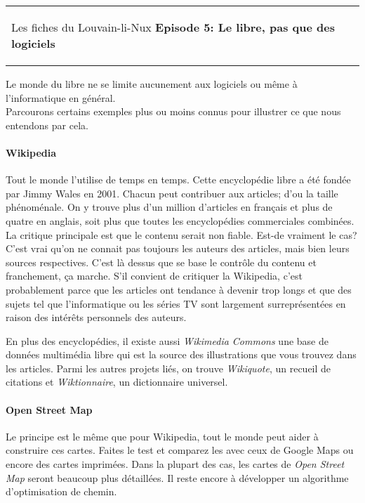 



\begin{tabular}{p{14cm}r}
    \begin{center}{\Large Les fiches du Louvain-li-Nux\linebreak \linebreak
    \LARGE \textbf{Episode 5: Le libre, pas que des logiciels}}\end{center}
		&
	\usebox{\logollnux}
\end{tabular}

Le monde du libre ne se limite aucunement aux logiciels ou même à l'informatique en général.\\
Parcourons certains exemples plus ou moins connus pour illustrer ce que nous entendons par cela.

\paragraph{Wikipedia}
Tout le monde l'utilise de temps en temps. Cette encyclopédie libre a été fondée par Jimmy Wales en 2001.
Chacun peut contribuer aux articles; d'ou la taille phénoménale.
On y trouve plus d'un million d'articles en français et plus de quatre en anglais, soit plus que toutes les encyclopédies commerciales combinées.
La critique principale est que le contenu serait non fiable.
Est-de vraiment le cas? C'est vrai qu'on ne connait pas toujours les auteurs des articles, mais bien leurs sources respectives.
C'est là dessus que se base le contrôle du contenu et franchement, ça marche.
S'il convient de critiquer la Wikipedia, c'est probablement parce que les articles ont tendance à devenir trop longs et que des sujets tel que l'informatique ou les séries TV
sont largement surreprésentées en raison des intérêts personnels des auteurs.

En plus des encyclopédies, il existe aussi \textit{Wikimedia Commons} une base de données multimédia libre
qui est la source des illustrations que vous trouvez dans les articles.
Parmi les autres projets liés, on trouve \textit{Wikiquote}, un recueil de citations et \textit{Wiktionnaire}, un dictionnaire universel.

\paragraph{Open Street Map}
Le principe est le même que pour Wikipedia, tout le monde peut aider à construire ces cartes.
Faites le test et comparez les avec ceux de Google Maps ou encore des cartes imprimées.
Dans la plupart des cas, les cartes de \textit{Open Street Map} seront beaucoup plus détaillées.
Il reste encore à développer un algorithme d'optimisation de chemin.

